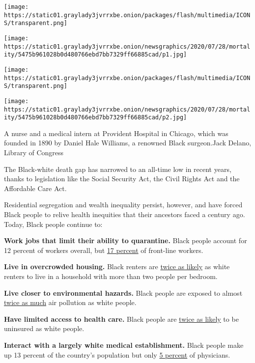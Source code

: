 \texttt{[image: https://static01.graylady3jvrrxbe.onion/packages/flash/multimedia/ICONS/transparent.png]}

\texttt{[image: https://static01.graylady3jvrrxbe.onion/newsgraphics/2020/07/28/mortality/5475b961028b0d480766ebd7bb7329ff66885cad/p1.jpg]}

\texttt{[image: https://static01.graylady3jvrrxbe.onion/packages/flash/multimedia/ICONS/transparent.png]}

\texttt{[image: https://static01.graylady3jvrrxbe.onion/newsgraphics/2020/07/28/mortality/5475b961028b0d480766ebd7bb7329ff66885cad/p2.jpg]}

A nurse and a medical intern at Provident Hospital in Chicago, which was
founded in 1890 by Daniel Hale Williams, a renowned Black surgeon.Jack
Delano, Library of Congress

The Black-white death gap has narrowed to an all-time low in recent
years, thanks to legislation like the Social Security Act, the Civil
Rights Act and the Affordable Care Act.

Residential segregation and wealth inequality persist, however, and have
forced Black people to relive health inequities that their ancestors
faced a century ago. Today, Black people continue to:

\textbf{Work jobs that limit their ability to quarantine.} Black people
account for 12 percent of workers overall, but
\href{https://www.epi.org/publication/black-workers-covid/}{17 percent}
of front-line workers.

\textbf{Live in overcrowded housing.} Black renters are
\href{https://www.gao.gov/assets/710/707179.pdf}{twice as likely} as
white renters to live in a household with more than two people per
bedroom.

\textbf{Live closer to environmental hazards.} Black people are exposed
to almost
\href{https://ajph-aphapublications-org.ezp-prod1.hul.harvard.edu/doi/pdf/10.2105/AJPH.2017.304297}{twice
as much} air pollution as white people.

\textbf{Have limited access to health care.} Black people are
\href{https://www.census.gov/content/dam/Census/library/publications/2019/demo/p60-267.pdf}{twice
as likely} to be uninsured as white people.

\textbf{Interact with a largely white medical establishment.} Black
people make up 13 percent of the country's population but only
\href{https://www.aamc.org/data-reports/workforce/interactive-data/figure-18-percentage-all-active-physicians-race/ethnicity-2018}{5
percent} of physicians.

